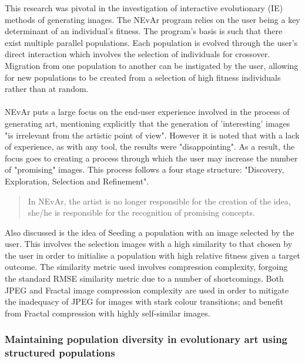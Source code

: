 \documentclass[10pt,a4paper]{article}
\begin{document}
This research was pivotal in the investigation of interactive evolutionary (IE) methods of generating images.
The NEvAr program relies on the user being a key determinant of an individual's fitness.
The program's basis is such that there exist multiple parallel populations.
Each population is evolved through the user's direct interaction which involves the selection of individuals for crossover.
Migration from one population to another can be instigated by the user, allowing for new populations to be created from a selection of high fitness individuals rather than at random.
\\\\
NEvAr puts a large focus on the end-user experience involved in the process of generating art, mentioning explicitly that the generation of 'interesting' images "is irrelevant from the artistic point of view".
However it is noted that with a lack of experience, as with any tool, the results were "disappointing".
As a result, the focus goes to creating a process through which the user may increase the number of "promising" images.
This process follows a four stage structure: "Discovery, Exploration, Selection and Refinement".
\begin{quotation}
In NEvAr, the artist is no longer responsible for the creation of the idea, she/he is responsible for the recognition of promising concepts.
\end{quotation}

Also discussed is the idea of Seeding a population with an image selected by the user.
This involves the selection images with a high similarity to that chosen by the user in order to initialise a population with high relative fitness given a target outcome.
The similarity metric used involves compression complexity, forgoing the standard RMSE similarity metric due to a number of shortcomings.
Both JPEG and Fractal image compression complexity are used in order to mitigate the inadequacy of JPEG for images with stark colour transitions; and benefit from Fractal compression with highly self-similar images.

\subsubsection{Maintaining population diversity in evolutionary art using structured populations \cite{distributed-evolutionary-art}}
\end{document}
